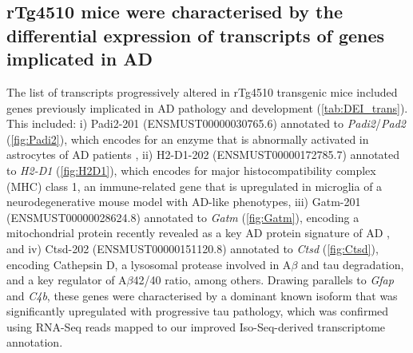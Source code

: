 \clearpage
\subsection{rTg4510 mice were characterised by the differential expression of transcripts of genes implicated in AD}
\label{ch5: diffisoexp}
The list of transcripts progressively altered in rTg4510 transgenic mice included genes previously implicated in AD pathology and development (\cref{tab:DEI_trans}). This included: i) Padi2-201 (ENSMUST00000030765.6) annotated to \textit{Padi2}/\textit{Pad2} (\cref{fig:Padi2}), which encodes for an enzyme that is abnormally activated in astrocytes of AD patients \cite{A2005}, ii) H2-D1-202 (ENSMUST00000172785.7) annotated to \textit{H2-D1} (\cref{fig:H2D1}), which encodes for major histocompatibility complex (MHC) class 1, an immune-related gene that is upregulated in microglia of a neurodegenerative mouse model with AD-like phenotypes\cite{Mathys2017}, iii) Gatm-201 (ENSMUST00000028624.8) annotated to \textit{Gatm} (\cref{fig:Gatm}), encoding a mitochondrial protein recently revealed as a key AD protein signature of AD \cite{Wang2020}, and iv) Ctsd-202 (ENSMUST00000151120.8) annotated to \textit{Ctsd} (\cref{fig:Ctsd}), encoding Cathepsin D, a lysosomal protease involved in A$\beta$ \cite{JR1996} and tau \cite{A1997} degradation, and a key regulator of A$\beta$42/40 ratio\cite{Suire2020}, among others. Drawing parallels to \textit{Gfap} and \textit{C4b}, these genes were characterised by a dominant known isoform that was significantly upregulated with progressive tau pathology, which was confirmed using RNA-Seq reads mapped to our improved Iso-Seq-derived transcriptome annotation. 


